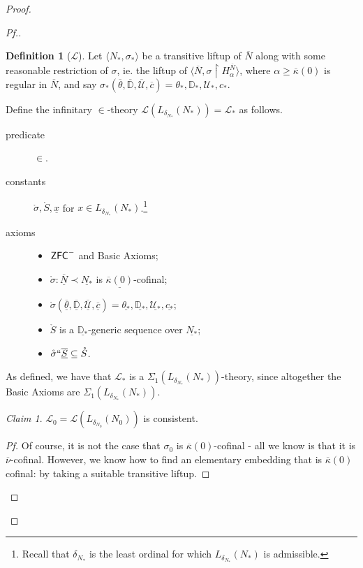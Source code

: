 \documentclass{amsart}
\theoremstyle{definition}
\newtheorem{definition}[theorem]{Definition}
\theoremstyle{remark}
\newtheorem{claimno}{Claim}
\newcommand{\D}{\mathbb{D}}
\newcommand{\N}{{\overline{N}}}
\newcommand{\U}{\mathcal{U}}
\newcommand{\ZFC}{\textup{\ensuremath{\textsf{ZFC}}}}
\newcommand{\rest}{\mathbin{\upharpoonright}}
\begin{document}
\begin{proof}
\begin{proof}[Pf.]
\begin{definition}[$\mathcal L$] \label{definition:L} Let $\langle N_*, \sigma_* \rangle$ be a transitive liftup of $\N$ along with some reasonable restriction of $\sigma$, ie. the liftup of $\langle \N, \sigma \rest H_{\alpha}^{\N} \rangle$, where $\alpha \geq \overline \kappa(0)$ is regular in $\N$, and say $\sigma_*(\overline \theta, \overline{\D}, \overline{\U}, \overline c) = \theta_*, \D_*, \U_*, c_*.$ 

Define the infinitary $\in$-theory $\mathcal L(L_{\delta_{N_*}}(N_*))=\mathcal L_*$ as follows. 
\begin{description}
	\item[predicate] $\in$.
	\item[constants] $\mathring{\sigma}, \mathring S, \underline x$ for $x \in L_{\delta_{N_*}}(N_*)$.\footnote{Recall that $\delta_{N_*}$ is the least ordinal for which $L_{\delta_{N_*}}(N_*)$ is admissible.}
	\item[axioms] \begin{itemize} \item $\ZFC^-$ and \textsf{Basic Axioms};
		\item $\mathring \sigma : \underline \N \prec \underline{N_*}$ is $\underline{\overline \kappa(0)}$-cofinal;
		\item $\mathring{\sigma}(\overline{\underline{\theta}}, \overline{\underline{\D}}, \overline{\underline{\U}}, \overline{\underline c})=\underline{\theta_*}, \underline{\D_*}, \underline{\U_*}, \underline{c_*}$;
		\item $\mathring S$ is a $\underline{\D_*}$-generic sequence over $\underline{N_*}$;
		\item $\mathring \sigma ``\overline{\underline S} \subseteq \mathring S$.
	\end{itemize}
\end{description} 
\end{definition}

As defined, we have that $\mathcal L_*$ is a $\Sigma_1(L_{\delta_{N_*}}(N_*))$-theory, since altogether the \textsf{Basic Axioms} are $\Sigma_1(L_{\delta_{N_*}}(N_*))$.

\begin{claimno} \label{claim:ConL0} $\mathcal L_0=\mathcal L(L_{\delta_{N_0}}(N_0))$ is consistent. \end{claimno}
\begin{proof}[Pf] Of course, it is not the case that $\sigma_0$ is $\overline \kappa(0)$-cofinal - all we know is that it is $\overline \nu$-cofinal. However, we know how to find an elementary embedding that is $\overline \kappa(0)$ cofinal: by taking a suitable transitive liftup.


\end{proof}
\end{proof}
\end{proof}
\end{document}
